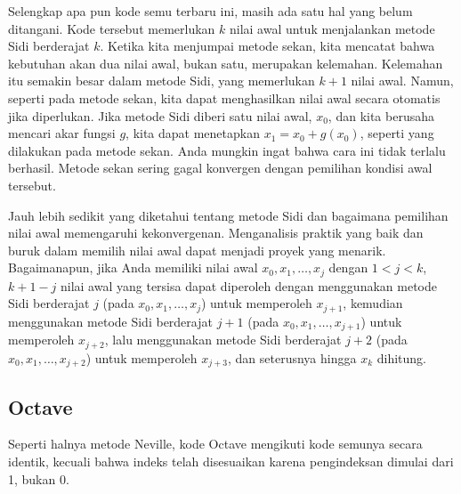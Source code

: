 \noindent Selengkap apa pun kode semu terbaru ini, masih ada satu
hal yang belum ditangani. Kode tersebut memerlukan $k$ nilai awal
untuk menjalankan metode Sidi berderajat $k$. Ketika kita menjumpai
metode sekan, kita mencatat bahwa kebutuhan akan dua nilai awal, bukan
satu, merupakan kelemahan. Kelemahan itu semakin besar dalam metode
Sidi, yang memerlukan $k+1$ nilai awal. Namun, seperti pada metode
sekan, kita dapat menghasilkan nilai awal secara otomatis jika diperlukan.
Jika metode Sidi diberi satu nilai awal, $x_{0}$, dan kita berusaha
mencari akar fungsi $g$, kita dapat menetapkan $x_{1}=x_{0}+g(x_{0})$,
seperti yang dilakukan pada metode sekan. Anda mungkin ingat bahwa
cara ini tidak terlalu berhasil. Metode sekan sering gagal konvergen
dengan pemilihan kondisi awal tersebut.

Jauh lebih sedikit yang diketahui tentang metode Sidi dan bagaimana
pemilihan nilai awal memengaruhi kekonvergenan. Menganalisis praktik
yang baik dan buruk dalam memilih nilai awal dapat menjadi proyek
yang menarik. Bagaimanapun, jika Anda memiliki nilai awal $x_{0},x_{1},\ldots,x_{j}$
dengan $1<j<k$, $k+1-j$ nilai awal yang tersisa dapat diperoleh
dengan menggunakan metode Sidi berderajat $j$ (pada $x_{0},x_{1},\ldots,x_{j}$)
untuk memperoleh $x_{j+1}$, kemudian menggunakan metode Sidi berderajat
$j+1$ (pada $x_{0},x_{1},\ldots,x_{j+1}$) untuk memperoleh $x_{j+2}$,
lalu menggunakan metode Sidi berderajat $j+2$ (pada $x_{0},x_{1},\ldots,x_{j+2}$)
untuk memperoleh $x_{j+3}$, dan seterusnya hingga $x_{k}$ dihitung.

\subsection{Octave}

Seperti halnya metode Neville, kode Octave mengikuti kode semunya
secara identik, kecuali bahwa indeks telah disesuaikan karena pengindeksan
dimulai dari 1, bukan 0.

